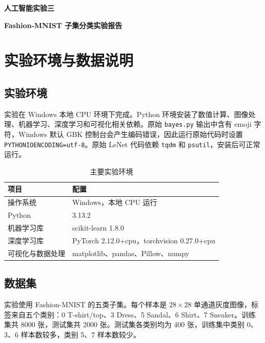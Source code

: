 \documentclass[UTF8]{ctexart}
\begin{document}
\begin{titlepage}
\centering
\vspace*{3cm}
{\bfseries 人工智能实验三\par}
\vspace{1cm}
{\bfseries Fashion-MNIST 子集分类实验报告\par}
\vspace{2cm}
{\large \par}
\end{titlepage}

\tableofcontents
\newpage

\section{实验环境与数据说明}

\subsection{实验环境}

实验在 Windows 本地 CPU 环境下完成。Python 环境安装了数值计算、图像处理、机器学习、深度学习和可视化相关依赖。原始 \texttt{bayes.py} 输出中含有 emoji 字符，Windows 默认 GBK 控制台会产生编码错误，因此运行原始代码时设置 \texttt{PYTHONIOENCODING=utf-8}。原始 LeNet 代码依赖 \texttt{tqdm} 和 \texttt{psutil}，安装后可正常运行。

\begin{table}[H]
\centering
\caption{主要实验环境}
\begin{tabular}{ll}
\toprule
项目 & 配置\\
\midrule
操作系统 & Windows，本地 CPU 运行\\
Python & 3.13.2\\
机器学习库 & scikit-learn 1.8.0\\
深度学习库 & PyTorch 2.12.0+cpu，torchvision 0.27.0+cpu\\
可视化与数据处理 & matplotlib、pandas、Pillow、numpy\\
\bottomrule
\end{tabular}
\end{table}

\subsection{数据集}

实验使用 Fashion-MNIST 的五类子集。每个样本是 $28\times 28$ 单通道灰度图像，标签来自五个类别：0 T-shirt/top、3 Dress、5 Sandal、6 Shirt、7 Sneaker。训练集共 8000 张，测试集共 2000 张。测试集各类别均为 400 张，训练集中类别 0、3、6 样本数较多，类别 5、7 样本数较少。
\end{document}
